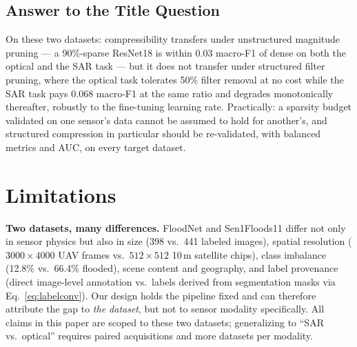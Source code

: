 \documentclass[conference]{IEEEtran}
\newif\ifreview
\newcommand{\REV}[1]{\ifreview\textcolor{red}{\textbf{[Revise: #1]}}\fi}
\newcommand{\HL}[1]{\ifreview\colorbox{yellow!55}{#1}\else #1\fi}
\begin{document}
\subsection{Answer to the Title Question}
On these two datasets: compressibility transfers under unstructured
magnitude pruning --- a 90\%-sparse ResNet18 is within $0.03$ macro-F1
of dense on both the optical and the SAR task --- but it does not
transfer under structured filter pruning, where the optical task
tolerates 50\% filter removal at no cost while the SAR task pays
\HL{$0.068$} macro-F1 at the same ratio and degrades monotonically
thereafter, robustly to the fine-tuning learning rate. Practically: a
sparsity budget validated on one sensor's data cannot be assumed to
hold for another's, and structured compression in particular should be
re-validated, with balanced metrics and AUC, on every target dataset.
\REV{[A3] ``one sensor's data cannot be assumed to hold for another's''
$\rightarrow$ ``one dataset's \ldots''. Replace 0.068 after A2. [B1 --
HIGHEST VALUE EXPERIMENT] Sen1Floods11 also provides \emph{Sentinel-2
optical} imagery of the \emph{same} hand-labeled chips. Run ResNet18
(dense, unstruct.\ 50/90\%, struct.\ 30/50/70/90\%, 3 seeds $=$ 21 runs
on 220 images) on RGB bands of those chips with the identical pipeline
and split. Same chips, same labels, same split, only the sensor
changes: this isolates modality, justifies the title, and removes the
confounds you list in Limitations. If time is too short, retitle to
``Across Datasets''.}

\section{Limitations}
\label{sec:limitations}
\textbf{Two datasets, many differences.} FloodNet and Sen1Floods11
differ not only in sensor physics but also in size (398 vs.\ 441
labeled images), spatial resolution ($3000\times4000$ UAV frames vs.\
$512\times512$ 10\,m satellite chips), class imbalance (12.8\% vs.\
66.4\% flooded), scene content and geography, and label provenance
(direct image-level annotation vs.\ labels derived from segmentation
masks via Eq.~\eqref{eq:labelconv}). Our design holds the pipeline
fixed and can therefore attribute the gap to \emph{the dataset}, but
not to sensor modality specifically. All claims in this paper are
scoped to these two datasets; generalizing to ``SAR vs.\ optical''
requires paired acquisitions and more datasets per modality.
\end{document}
